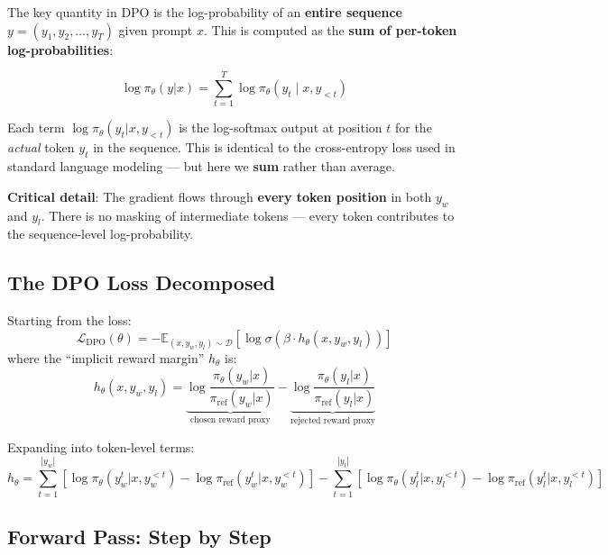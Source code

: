 The key quantity in DPO is the log-probability of an \textbf{entire sequence} $y = (y_1, y_2, \ldots, y_T)$ given prompt $x$. This is computed as the \textbf{sum of per-token log-probabilities}:

\begin{equation}
\boxed{\log \pi_\theta(y|x) = \sum_{t=1}^{T} \log \pi_\theta(y_t \mid x, y_{<t})}
\end{equation}

Each term $\log \pi_\theta(y_t | x, y_{<t})$ is the log-softmax output at position $t$ for the \emph{actual} token $y_t$ in the sequence. This is identical to the cross-entropy loss used in standard language modeling --- but here we \textbf{sum} rather than average.

\textbf{Critical detail}: The gradient flows through \textbf{every token position} in both $y_w$ and $y_l$. There is no masking of intermediate tokens --- every token contributes to the sequence-level log-probability.

\subsection{The DPO Loss Decomposed}
\label{the-dpo-loss-decomposed}

Starting from the loss: 
\begin{equation}
\mathcal{L}_{\text{DPO}}(\theta) = -\mathbb{E}_{(x, y_w, y_l) \sim \mathcal{D}}\!\left[\log \sigma\!\left(\beta \cdot h_\theta(x, y_w, y_l)\right)\right]
\end{equation}
 where the ``implicit reward margin'' $h_\theta$ is: 
\begin{equation}
h_\theta(x, y_w, y_l) = \underbrace{\log \frac{\pi_\theta(y_w|x)}{\pi_{\text{ref}}(y_w|x)}}_{\text{chosen reward proxy}} - \underbrace{\log \frac{\pi_\theta(y_l|x)}{\pi_{\text{ref}}(y_l|x)}}_{\text{rejected reward proxy}}
\end{equation}

Expanding into token-level terms: 
\begin{equation}
\boxed{h_\theta = \sum_{t=1}^{|y_w|}\!\left[\log\pi_\theta(y_w^t | x, y_w^{<t}) - \log\pi_{\text{ref}}(y_w^t | x, y_w^{<t})\right] - \sum_{t=1}^{|y_l|}\!\left[\log\pi_\theta(y_l^t | x, y_l^{<t}) - \log\pi_{\text{ref}}(y_l^t | x, y_l^{<t})\right]}
\end{equation}

\subsection{Forward Pass: Step by Step}
\label{forward-pass-step-by-step}

